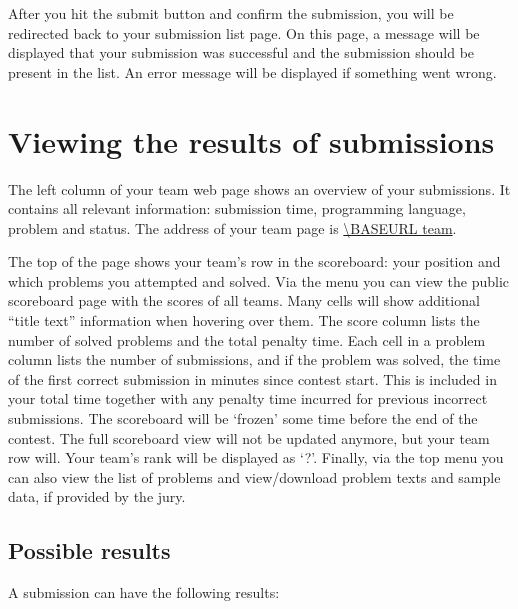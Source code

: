 After you hit the submit button and confirm the submission, you will
be redirected back to your submission list page. On this page, a message
will be displayed that your submission was successful and the
submission should be present in the list. An error message will be
displayed if something went wrong.

\section{Viewing the results of submissions}

The left column of your team web page shows an overview of your submissions.
It contains all relevant information: submission time, programming
language, problem and status. The address of your team page is
\url{\BASEURL team}.

The top of the page shows your team's row in the scoreboard: your position and
which problems you attempted and solved. Via the menu you can view the public
scoreboard page with the scores of all teams. Many cells will show
additional ``title text'' information when hovering over them. The
score column lists the number of solved problems and the total penalty
time. Each cell in a problem column lists the number of submissions,
and if the problem was solved, the time of the first correct
submission in minutes since contest start. This is included in your
total time together with any penalty time incurred for previous
incorrect submissions. The scoreboard will
be `frozen' some time before the end of the contest. The full scoreboard view
will not be updated anymore, but your team row will. Your team's rank will
be displayed as `?'. Finally, via the top menu you can also view the
list of problems and view/download problem texts and sample data, if
provided by the jury.

\subsection{Possible results}

A submission can have the following results:


